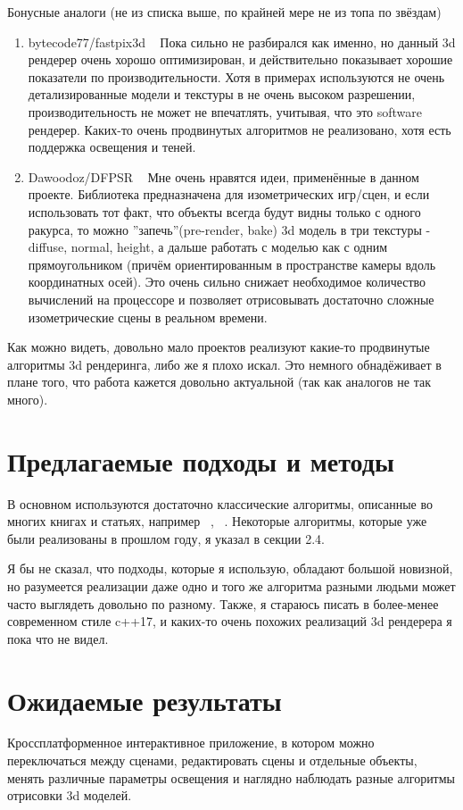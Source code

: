 \documentclass[12pt]{article}
\begin{document}
Бонусные аналоги (не из списка выше, по крайней мере не из топа по звёздам)
\begin{enumerate}
	\item bytecode77/fastpix3d ~\cite{renderer9} Пока сильно не разбирался как именно, но данный 3d рендерер очень хорошо оптимизирован, и действительно показывает хорошие показатели по производительности. Хотя в примерах используются не очень детализированные модели и текстуры в не очень высоком разрешении, производительность не может не впечатлять, учитывая, что это software рендерер. Каких-то очень продвинутых алгоритмов не реализовано, хотя есть поддержка освещения и теней.
	\item Dawoodoz/DFPSR ~\cite{renderer10} Мне очень нравятся идеи, применённые в данном проекте. Библиотека предназначена для изометрических игр/сцен, и если использовать тот факт, что объекты всегда будут видны только с одного ракурса, то можно ''запечь''(pre-render, bake) 3d модель в три текстуры - diffuse, normal, height, а дальше работать с моделью как с одним прямоугольником (причём ориентированным в пространстве камеры вдоль координатных осей). Это очень сильно снижает необходимое количество вычислений на процессоре и позволяет отрисовывать достаточно сложные изометрические сцены в реальном времени.
\end{enumerate}

Как можно видеть, довольно мало проектов реализуют какие-то продвинутые алгоритмы 3d рендеринга, либо же я плохо искал. Это немного обнадёживает в плане того, что работа кажется довольно актуальной (так как аналогов не так много).

\section{Предлагаемые подходы и методы}
В основном используются достаточно классические алгоритмы, описанные во многих книгах и статьях, например ~\cite{Math3d}, ~\cite{LRN}. Некоторые алгоритмы, которые уже были реализованы в прошлом году, я указал в секции 2.4.

Я бы не сказал, что подходы, которые я использую, обладают большой новизной, но разумеется реализации даже одно и того же алгоритма разными людьми может часто выглядеть довольно по разному. Также, я стараюсь писать в более-менее современном стиле c++17, и каких-то очень похожих реализаций 3d рендерера я пока что не видел.

\section{Ожидаемые результаты}
Кроссплатформенное интерактивное приложение, в котором можно переключаться между сценами, редактировать сцены и отдельные объекты, менять различные параметры освещения и наглядно наблюдать разные алгоритмы отрисовки 3d моделей. 
\end{document}
